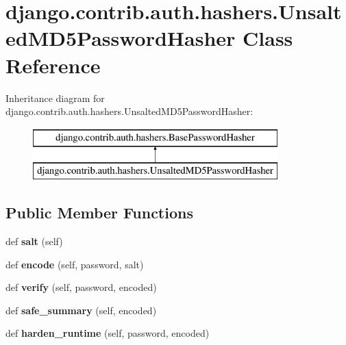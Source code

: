 \hypertarget{classdjango_1_1contrib_1_1auth_1_1hashers_1_1_unsalted_m_d5_password_hasher}{}\section{django.\+contrib.\+auth.\+hashers.\+Unsalted\+M\+D5\+Password\+Hasher Class Reference}
\label{classdjango_1_1contrib_1_1auth_1_1hashers_1_1_unsalted_m_d5_password_hasher}
Inheritance diagram for django.\+contrib.\+auth.\+hashers.\+Unsalted\+M\+D5\+Password\+Hasher\+:\begin{figure}[H]
\begin{center}
\leavevmode
\includegraphics[height=2.000000cm]{classdjango_1_1contrib_1_1auth_1_1hashers_1_1_unsalted_m_d5_password_hasher}
\end{center}
\end{figure}
\subsection*{Public Member Functions}
\begin{DoxyCompactItemize}
\item 
\mbox{\label{classdjango_1_1contrib_1_1auth_1_1hashers_1_1_unsalted_m_d5_password_hasher_ab9bfd42e74dbd0f481f2d4d1a7f83c80}} 
def {\bfseries salt} (self)
\item 
\mbox{\label{classdjango_1_1contrib_1_1auth_1_1hashers_1_1_unsalted_m_d5_password_hasher_aa4f81b6de8892420c4e61ce1462d34ca}} 
def {\bfseries encode} (self, password, salt)
\item 
\mbox{\label{classdjango_1_1contrib_1_1auth_1_1hashers_1_1_unsalted_m_d5_password_hasher_ada0618a6985af276942611c54b35d331}} 
def {\bfseries verify} (self, password, encoded)
\item 
\mbox{\label{classdjango_1_1contrib_1_1auth_1_1hashers_1_1_unsalted_m_d5_password_hasher_a42130d2a57bca8785c529647a1276cc3}} 
def {\bfseries safe\+\_\+summary} (self, encoded)
\item 
\mbox{\label{classdjango_1_1contrib_1_1auth_1_1hashers_1_1_unsalted_m_d5_password_hasher_a4db71b390f376ef37c0b6c6669da985a}} 
def {\bfseries harden\+\_\+runtime} (self, password, encoded)
\end{DoxyCompactItemize}

